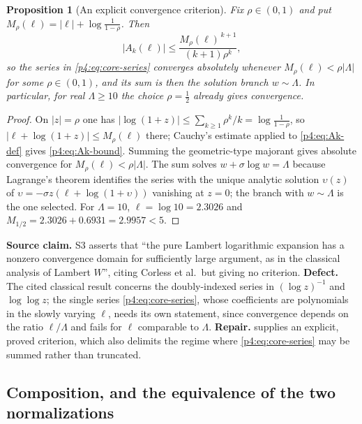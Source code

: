 \documentclass[11pt,a4paper,oneside]{book}
\theoremstyle{plain}
\newtheorem{proposition}[theorem]{Proposition}
\theoremstyle{definition}
\theoremstyle{remark}
\begin{document}
\begin{proposition}[An explicit convergence criterion]
\label{p4:prop:core-convergence}
Fix $\rho\in(0,1)$ and put $M_\rho(\ell)=|\ell|+\log\frac1{1-\rho}$.  Then
\begin{equation}
  |A_k(\ell)|\le\frac{M_\rho(\ell)^{\,k+1}}{(k+1)\rho^{k}},
  \label{p4:eq:Ak-bound}
\end{equation}
so the series in \cref{p4:eq:core-series} converges absolutely whenever
$M_\rho(\ell)<\rho|\Lambda|$ for some $\rho\in(0,1)$, and its sum is then the
solution branch $w\sim\Lambda$.  In particular, for real $\Lambda\ge10$ the
choice $\rho=\tfrac12$ already gives convergence.
\end{proposition}

\begin{proof}
On $|z|=\rho$ one has $|\log(1+z)|\le\sum_{k\ge1}\rho^{k}/k
=\log\frac1{1-\rho}$, so $|\ell+\log(1+z)|\le M_\rho(\ell)$ there; Cauchy's
estimate applied to \cref{p4:eq:Ak-def} gives \cref{p4:eq:Ak-bound}.  Summing
the geometric-type majorant gives absolute convergence for
$M_\rho(\ell)<\rho|\Lambda|$.  The sum solves
$w+\sigma\log w=\Lambda$ because Lagrange's theorem identifies the series with
the unique analytic solution $\upsilon(z)$ of
$\upsilon=-\sigma z(\ell+\log(1+\upsilon))$ vanishing at $z=0$; the branch
with $w\sim\Lambda$ is the one selected.  For $\Lambda=10$,
$\ell=\log10=2.3026$ and $M_{1/2}=2.3026+0.6931=2.9957<5$.
\end{proof}

\begin{repairbox}
\textbf{Source claim.}  \textsf{S3} asserts that ``the pure Lambert
logarithmic expansion has a nonzero convergence domain for sufficiently large
argument, as in the classical analysis of Lambert $W$'', citing Corless et
al.\ but giving no criterion.  \textbf{Defect.}  The cited classical result
concerns the doubly-indexed series in $(\log z)^{-1}$ and $\log\log z$; the
single series \cref{p4:eq:core-series}, whose coefficients are polynomials in
the slowly varying $\ell$, needs its own statement, since convergence depends
on the ratio $\ell/\Lambda$ and fails for $\ell$ comparable to $\Lambda$.
\textbf{Repair.}   supplies an explicit,
proved criterion, which also delimits the regime where
\cref{p4:eq:core-series} may be summed rather than truncated.
\end{repairbox}

\subsection{Composition, and the equivalence of the two normalizations}
\end{document}
